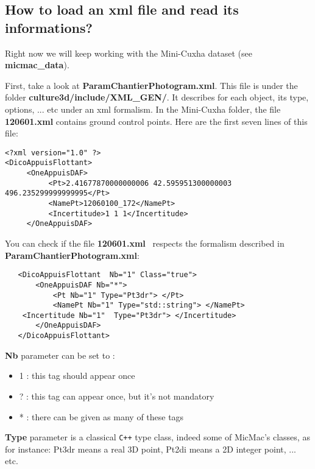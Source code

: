 \documentclass[a4paper]{book}
\begin{document}
\subsection{How to load an xml file and read its informations?}
Right now we will keep working with the Mini-Cuxha dataset (see \textbf{micmac\_data}). \newline

First, take a look at \og \textbf{ParamChantierPhotogram.xml}\fg. \newline
This file is under the folder \og\textbf{culture3d/include/XML\_GEN/}\fg. It describes for each object, its type, options, ... etc under an xml formalism. In the Mini-Cuxha folder, the file \textbf{120601.xml} contains ground control points. Here are the first seven lines of this file:
\begin{lstlisting}
<?xml version="1.0" ?>
<DicoAppuisFlottant>
     <OneAppuisDAF>
          <Pt>2.41677870000000006 42.595951300000003 496.235299999999995</Pt>
          <NamePt>12060100_172</NamePt>
          <Incertitude>1 1 1</Incertitude>
     </OneAppuisDAF>
\end{lstlisting}

You can check if the file \og \textbf{120601.xml} \fg\ respects the formalism described in \textbf{ParamChantierPhotogram.xml}:\newline
\begin{lstlisting}
   <DicoAppuisFlottant  Nb="1" Class="true">
       <OneAppuisDAF Nb="*">
           <Pt Nb="1" Type="Pt3dr"> </Pt>
           <NamePt Nb="1" Type="std::string"> </NamePt>
	<Incertitude Nb="1"  Type="Pt3dr"> </Incertitude>
       </OneAppuisDAF>
   </DicoAppuisFlottant>
\end{lstlisting}

\textbf{Nb} parameter can be set to :
\begin{itemize}
\item 1 : this tag should appear once
\item ? : this tag can appear once, but it's not mandatory
\item * : there can be given as many of these tags \newline
\end{itemize}

\textbf{Type} parameter is a classical \verb!C++! type class, indeed some of MicMac's classes, as for instance: Pt3dr means a real 3D point, Pt2di means a 2D integer point, ... etc. \newline
\end{document}
